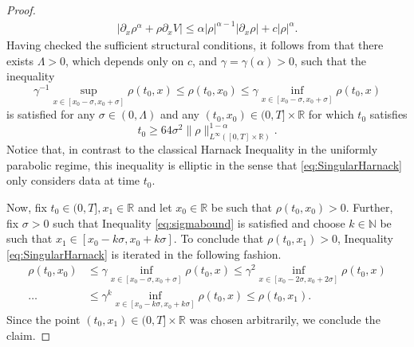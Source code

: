 \documentclass[a4paper,twosided, 11pt]{article}
\newcommand{\R}{\mathbb{R}}
\newcommand{\N}{\mathbb{N}}
\theoremstyle{plain}
\theoremstyle{remark}
\numberwithin{equation}{section}
\begin{document}
\begin{proof}
\begin{align*}
    |\partial_x\rho^\alpha + \rho \partial_x V| \leq \alpha |\rho|^{\alpha-1}|\partial_x \rho| + c|\rho|^\alpha.
\end{align*}
Having checked the sufficient structural conditions, it follows from \cite[Corollary 16.1]{DiBenedettoGianazzaVespri12} that there exists $\Lambda > 0$, which depends only on $c$, and $\gamma = \gamma (\alpha) > 0$, such that the inequality 
\begin{equation}\label{eq:SingularHarnack}
 \gamma^{-1}\sup_{x \in [x_0-\sigma, x_0 + \sigma ]}\rho(t_0,x) \leq \rho(t_0,x_0) \leq \gamma \inf_{x \in [x_0-\sigma, x_0 + \sigma]}\rho(t_0,x)   
\end{equation}
is satisfied for any $\sigma \in (0,\Lambda)$ and any $(t_0,x_0) \in (0,T]\times \R$ for which $t_0$ satisfies
\begin{equation}\label{eq:sigmabound}
   t_0 \geq 64 \sigma^2\|\rho\|_{L^\infty([0,T]\times\R)}^{1-\alpha}. 
\end{equation}
Notice that, in contrast to the classical Harnack Inequality in the uniformly parabolic regime, this inequality is elliptic in the sense that \eqref{eq:SingularHarnack} only considers data at time $t_0$.

\medskip 

Now, fix $t_0 \in (0,T], x_1 \in \R$ and let $x_0 \in \R$ be such that $\rho(t_0,x_0) > 0$. 
Further, fix $\sigma > 0$ such that Inequality \eqref{eq:sigmabound} is satisfied and choose $k \in \N $ be such that $x_1 \in [x_0 - k\sigma, x_0+k \sigma ]$.
To conclude that $\rho(t_0,x_1) > 0$, Inequality \eqref{eq:SingularHarnack} is iterated in the following fashion.
\begin{align*}
    \rho(t_0,x_0) & \leq \gamma \inf_{x \in [x_0-\sigma, x_0 + \sigma]}\rho(t_0,x)  \leq   \gamma^2 \inf_{x \in [x_0-2\sigma, x_0 + 2\sigma]}\rho(t_0,x)\\
    \dots & \leq \gamma^k \inf_{x \in [x_0-k\sigma, x_0 + k\sigma]}\rho(t_0,x) \leq \rho(t_0,x_1).
\end{align*}
Since the point $(t_0,x_1) \in (0,T]\times \R$ was chosen arbitrarily, we conclude the claim.
\end{proof}
\end{document}
